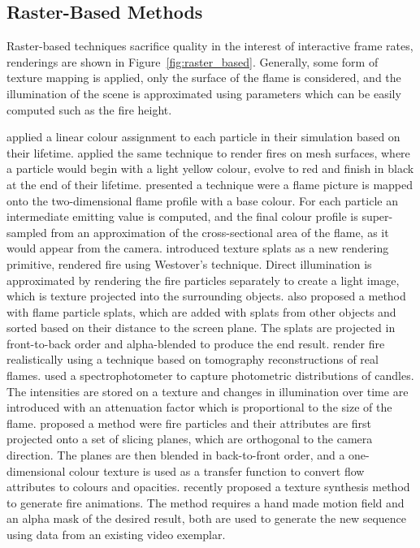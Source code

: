 \subsection{Raster-Based Methods}
\label{sec:raster_based}

Raster-based techniques sacrifice quality in the interest of interactive frame rates, renderings are shown in Figure~\ref{fig:raster_based}.
Generally, some form of texture mapping is applied, only the surface of the flame is considered, and the illumination of the scene is approximated using parameters which can be easily computed such as the fire height.

\cite{Reeves:1983} applied a linear colour assignment to each particle in their simulation based on their lifetime.
\cite{Lee:2001} applied the same technique to render fires on mesh surfaces, where a particle would begin with a light yellow colour, evolve to red and finish in black at the end of their lifetime.
\cite{Lamorlette:2002} presented a technique were a flame picture is mapped onto the two-dimensional flame profile with a base colour.
For each particle an intermediate emitting value is computed, and the final colour profile is super-sampled from an approximation of the cross-sectional area of the flame, as it would appear from the camera.
\cite{Westover:1990} introduced texture splats as a new rendering primitive, \cite{Wei:2002} rendered fire using Westover's technique.
Direct illumination is approximated by rendering the fire particles separately to create a light image, which is texture projected into the surrounding objects.
\cite{Zhao:2003} also proposed a method with flame particle splats, which are added with splats from other objects and sorted based on their distance to the screen plane.
The splats are projected in front-to-back order and alpha-blended to produce the end result.
\cite{Ihrke:2004} render fire realistically using a technique based on tomography reconstructions of real flames. 
\cite{Bridault:2006} used a spectrophotometer to capture photometric distributions of candles.
The intensities are stored on a texture and changes in illumination over time are introduced with an attenuation factor which is proportional to the size of the flame.
\cite{Zhang:2011} proposed a method were fire particles and their attributes are first projected onto a set of slicing planes, which are orthogonal to the camera direction. 
The planes are then blended in back-to-front order, and a one-dimensional colour texture is used as a transfer function to convert flow attributes to colours and opacities. 
\cite{Jamriska:2015} recently proposed a texture synthesis method to generate fire animations.
The method requires a hand made motion field and an alpha mask of the desired result, both are used to generate the new sequence using data from an existing video exemplar.

